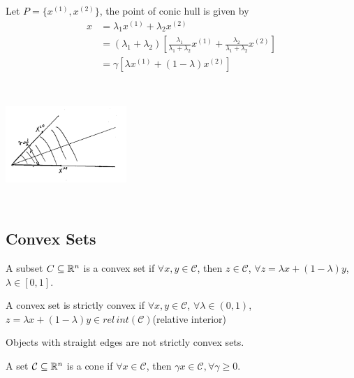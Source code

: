 \begin{example}
Let $P = \{x^{(1)}, x^{(2)} \}$, the point of conic hull is given by 
\begin{align*}
x 
&= \lambda_1x^{(1)} + \lambda_2x^{(2)}\\
&= ( \lambda_1 + \lambda_2)[\frac{\lambda_1}{\lambda_1 + \lambda_2}x^{(1)} + \frac{\lambda_2}{\lambda_1 + \lambda_2}x^{(2)}]\\
&= \gamma[\lambda x^{(1)} + (1-\lambda)x^{(2)}]
\end{align*}

\begin{marginfigure}
	\centering
	\includegraphics[width=1.8in,height=1.8in]{figures/ch08/figure1023_4.png}
\end{marginfigure}

\end{example}


\subsection{Convex Sets}

\begin{definition}
	A subset $C\subseteq \mathbb{R}^n$ is a convex set if $\forall x,y \in \mathcal{C}$, then $z\in \mathcal{C}$, $\forall z = \lambda x + (1-\lambda)y$, $\lambda \in [0,1].$
\end{definition}


\begin{definition}
	A convex set is strictly convex if $\forall x,y \in \mathcal{C}$, $\forall \lambda \in (0,1)$, $z = \lambda x + (1-\lambda)y \in rel\,int(\mathcal{C})$(relative interior)
\end{definition}

Objects with straight edges are not strictly convex sets.

\begin{definition}[Cone]
	A set $\mathcal{C}\subseteq \mathbb{R}^n $ is a cone if $\forall x\in \mathcal{C}$, then $\gamma x\in \mathcal{C}, \forall \gamma \geq 0$.
\end{definition}


